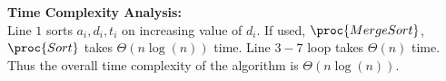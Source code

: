\documentclass[11pt]{article}
\begin{document}
\begin{enumerate}
    \textbf{Time Complexity Analysis:}\\
    Line $1$ sorts $a_i,d_i,t_i$ on increasing value of $d_i$. If used, $\proc{MergeSort}$, $\proc{Sort}$ takes $\Theta(n\log(n))$ time. Line $3-7$ loop takes $\Theta(n)$ time.
    Thus the overall time complexity of the algorithm is $\Theta(n\log(n))$.
\end{enumerate}
\end{document}
